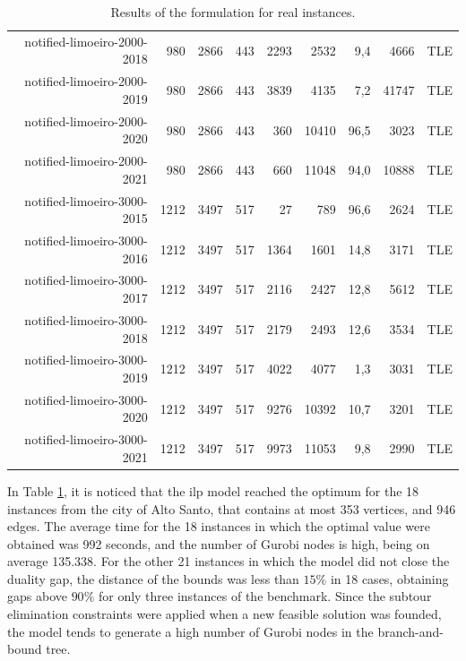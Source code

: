 \documentclass[a4paper,11pt]{article}
\begin{document}
\begin{table}[!ht]
{\begin{tabular}{rrrrrrrrr}
\rowcolor[HTML]{C0C0C0} 
notified-limoeiro-2000-2018   & 980  & 2866 & 443 & 2293 & 2532  & 9,4  & 4666   & TLE    \\
\rowcolor[HTML]{C0C0C0} 
notified-limoeiro-2000-2019   & 980  & 2866 & 443 & 3839 & 4135  & 7,2  & 41747  & TLE    \\
\rowcolor[HTML]{C0C0C0} 
notified-limoeiro-2000-2020   & 980  & 2866 & 443 & 360  & 10410 & 96,5 & 3023   & TLE    \\
\rowcolor[HTML]{C0C0C0} 
notified-limoeiro-2000-2021   & 980  & 2866 & 443 & 660  & 11048 & 94,0 & 10888  & TLE    \\ \hline
\rowcolor[HTML]{C0C0C0} 
notified-limoeiro-3000-2015   & 1212 & 3497 & 517 & 27   & 789   & 96,6 & 2624   & TLE    \\
\rowcolor[HTML]{C0C0C0} 
notified-limoeiro-3000-2016   & 1212 & 3497 & 517 & 1364 & 1601  & 14,8 & 3171   & TLE    \\
\rowcolor[HTML]{C0C0C0} 
notified-limoeiro-3000-2017   & 1212 & 3497 & 517 & 2116 & 2427  & 12,8 & 5612   & TLE    \\
\rowcolor[HTML]{C0C0C0} 
notified-limoeiro-3000-2018   & 1212 & 3497 & 517 & 2179 & 2493  & 12,6 & 3534   & TLE    \\
\rowcolor[HTML]{C0C0C0} 
notified-limoeiro-3000-2019   & 1212 & 3497 & 517 & 4022 & 4077  & 1,3  & 3031   & TLE    \\
\rowcolor[HTML]{C0C0C0} 
notified-limoeiro-3000-2020   & 1212 & 3497 & 517 & 9276 & 10392 & 10,7 & 3201   & TLE    \\
\rowcolor[HTML]{C0C0C0} 
notified-limoeiro-3000-2021   & 1212 & 3497 & 517 & 9973 & 11053 & 9,8  & 2990   & TLE    \\ \hline
\end{tabular}%
}
\caption{Results of the formulation for real instances.}
\label{tab:model-results}
\end{table}

In Table \ref{tab:model-results}, it is noticed that the \gls{ilp} model reached
the optimum for the  18 instances from the city of Alto  Santo, that contains at
most 353 vertices, and 946 edges. The average time for the 18 instances in which
the optimal value were obtained was 992  seconds, and the number of Gurobi nodes
is high, being on average 135.338. For the other 21 instances in which the model
did not close the  duality gap, the distance of the bounds  was less than $15\%$
in  18 cases,  obtaining  gaps above  $90\%$  for only  three  instances of  the
benchmark. Since  the subtour  elimination constraints were  applied when  a new
feasible solution  was founded,  the model  tends to generate  a high  number of
Gurobi nodes in the branch-and-bound tree.
\end{document}
